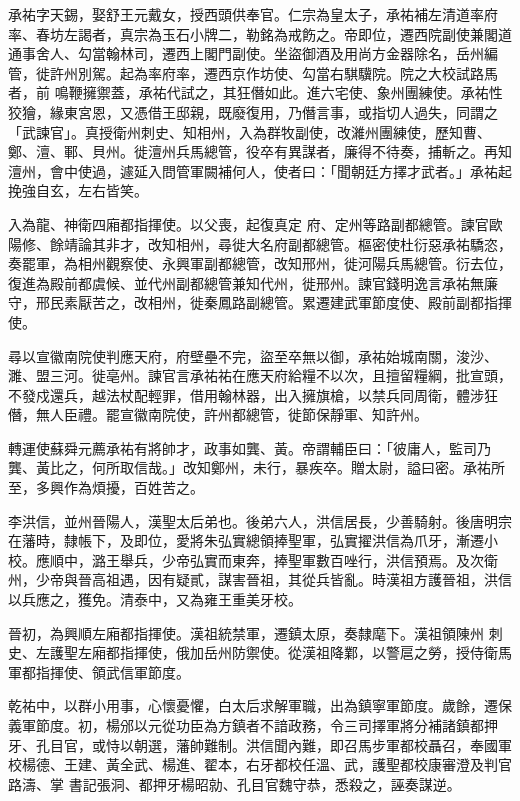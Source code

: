\begin{pinyinscope}
 承祐字天錫，娶舒王元戴女，授西頭供奉官。仁宗為皇太子，承祐補左清道率府率、春坊左謁者，真宗為玉石小牌二，勒銘為戒飭之。帝即位，遷西院副使兼閣道通事舍人、勾當翰林司，遷西上閣門副使。坐盜御酒及用尚方金器除名，岳州編管，徙許州別駕。起為率府率，遷西京作坊使、勾當右騏驥院。院之大校試路馬者，前
 鳴鞭擁禦蓋，承祐代試之，其狂僭如此。進六宅使、象州團練使。承祐性狡獪，緣東宮恩，又憑借王邸親，既廢復用，乃僭言事，或指切人過失，同謂之「武諫官」。真授衛州刺史、知相州，入為群牧副使，改濰州團練使，歷知曹、鄭、澶、鄆、貝州。徙澶州兵馬總管，役卒有異謀者，廉得不待奏，捕斬之。再知澶州，會中使過，遽延入問管軍闕補何人，使者曰：「聞朝廷方擇才武者。」承祐起挽強自玄，左右皆笑。



 入為龍、神衛四廂都指揮使。以父喪，起復真定
 府、定州等路副都總管。諫官歐陽修、餘靖論其非才，改知相州，尋徙大名府副都總管。樞密使杜衍惡承祐驕恣，奏罷軍，為相州觀察使、永興軍副都總管，改知邢州，徙河陽兵馬總管。衍去位，復進為殿前都虞候、並代州副都總管兼知代州，徙邢州。諫官錢明逸言承祐無廉守，邢民素厭苦之，改相州，徙秦鳳路副總管。累遷建武軍節度使、殿前副都指揮使。



 尋以宣徽南院使判應天府，府壁壘不完，盜至卒無以御，承祐始城南關，浚沙、
 濉、盟三河。徙亳州。諫官言承祐祐在應天府給糧不以次，且擅留糧綱，批宣頭，不發戍還兵，越法杖配輕罪，借用翰林器，出入擁旗槍，以禁兵同周衛，體涉狂僭，無人臣禮。罷宣徽南院使，許州都總管，徙節保靜軍、知許州。



 轉運使蘇舜元薦承祐有將帥才，政事如龔、黃。帝謂輔臣曰：「彼庸人，監司乃龔、黃比之，何所取信哉。」改知鄭州，未行，暴疾卒。贈太尉，謚曰密。承祐所至，多興作為煩擾，百姓苦之。



 李洪信，並州晉陽人，漢聖太后弟也。後弟六人，洪信居長，少善騎射。後唐明宗在藩時，隸帳下，及即位，愛將朱弘實總領捧聖軍，弘實擢洪信為爪牙，漸遷小校。應順中，潞王舉兵，少帝弘實而東奔，捧聖軍數百唑行，洪信預焉。及次衛州，少帝與晉高祖遇，因有疑貳，謀害晉祖，其從兵皆亂。時漢祖方護晉祖，洪信以兵應之，獲免。清泰中，又為雍王重美牙校。



 晉初，為興順左廂都指揮使。漢祖統禁軍，遷鎮太原，奏隸麾下。漢祖領陳州
 刺史、左護聖左廂都指揮使，俄加岳州防禦使。從漢祖降鄴，以警扈之勞，授侍衛馬軍都指揮使、領武信軍節度。



 乾祐中，以群小用事，心懷憂懼，白太后求解軍職，出為鎮寧軍節度。歲餘，遷保義軍節度。初，楊邠以元從功臣為方鎮者不諳政務，令三司擇軍將分補諸鎮都押牙、孔目官，或恃以朝選，藩帥難制。洪信聞內難，即召馬步軍都校聶召，奉國軍校楊德、王建、黃全武、楊進、翟本，右牙都校任溫、武，護聖都校康審澄及判官路濤、掌
 書記張洞、都押牙楊昭勍、孔目官魏守恭，悉殺之，誣奏謀逆。




\end{pinyinscope}
